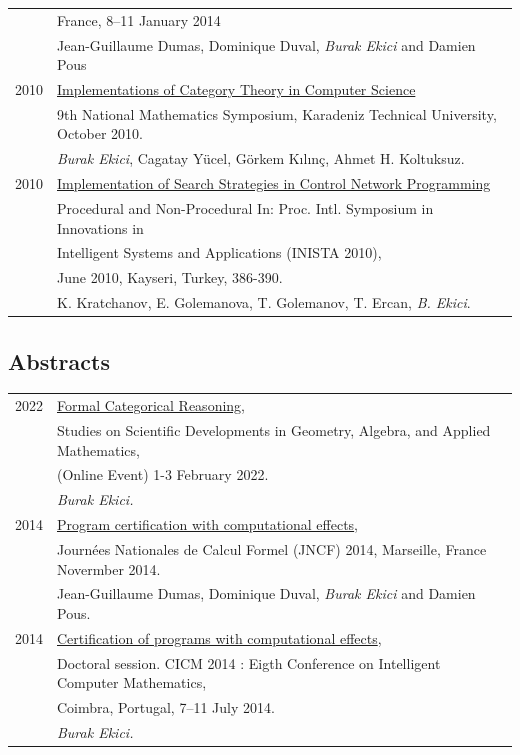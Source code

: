 \documentclass[a4paper,9pt]{article} %
\begin{document}
\begin{longtable}{ll}
& France, 8--11 January 2014\\
&  Jean-Guillaume Dumas, Dominique Duval, \emph{Burak Ekici} and Damien Pous
 \\[0.20cm]
2010 & \href{http://ekiciburak.github.io/}{Implementations of Category Theory in Computer Science}\\
& 9th National Mathematics Symposium, Karadeniz Technical University, October 2010.\\
& \emph{Burak Ekici}, Cagatay Yücel, Görkem Kılınç, Ahmet H. Koltuksuz.
 \\[0.20cm]
2010 & \href{http://arxiv.org/abs/1412.4184}{Implementation of Search Strategies in Control Network Programming}\\\
& {Procedural and Non-Procedural In: Proc. Intl. Symposium in Innovations in} \\
&{Intelligent Systems and Applications (INISTA 2010),}\\
& {June 2010, Kayseri, Turkey, 386-390.}\\
 & K. Kratchanov, E. Golemanova, T. Golemanov, T. Ercan, \emph{B. Ekici}.
\end{longtable}

\subsection*{Abstracts}
\begin{longtable}{ll}	
2022 &
\href{https://www.researchgate.net/profile/Rashid-Abu-Dawwas/publication/359082788_On_Graded_1-Absorbing_Primary_Ideals/links/6227168c97401151d206310f/On-Graded-1-Absorbing-Primary-Ideals.pdf#page=52}{Formal Categorical Reasoning},\\
& Studies on Scientific Developments in Geometry, Algebra, and Applied
Mathematics,\\
&(Online Event) 1-3 February 2022.\\
& \emph{Burak Ekici.}
 \\[0.20cm]
2014 &
\href{http://arxiv.org/abs/1411.7140}{Program certification with computational effects},\\
& {Journées Nationales de Calcul Formel (JNCF) 2014, Marseille, France Novermber 2014.}\\
& Jean-Guillaume Dumas, Dominique Duval, \emph{Burak Ekici} and Damien Pous.
\\[0.25cm]
2014 &
\href{http://arxiv.org/abs/1411.7139}{Certification of programs with computational effects},\\
& Doctoral session. CICM 2014 : Eigth Conference on Intelligent Computer Mathematics,\\
& Coimbra, Portugal, 7--11 July 2014.\\
&   \emph{Burak Ekici.}
\end{longtable}
\end{document}
